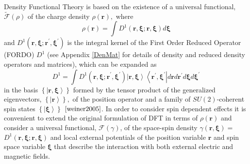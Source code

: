 \documentclass[aps,preprint]{revtex4}%
\begin{document}
\bigskip Density Functional Theory is based on the existence of a universal
functional, $\mathcal{\tilde{F}}\left(  \rho\right)  $ \cite{HK} of the charge
density $\rho\left(  \mathbf{r}\right)  ,$ where
\begin{equation}
\rho\left(  \mathbf{r}\right)  =\int D^{1}\left(  \mathbf{r,\xi;r,\xi}\right)
d\mathbf{\xi}%
\end{equation}
and $D^{1}\left(  \mathbf{r,\xi;r}^{\prime}\mathbf{,\xi}^{\prime}\right)  $ is
the integral kernel of the First Order Reduced Operator (FORDO) $D^{1}$
\cite{Coleman} (see Appendix \ref{DenMat} for details of density and reduced
density operators and matrices), which can be expanded as
\begin{equation}
D^{1}=\int D^{1}\left(  \mathbf{r,\xi;r}^{\prime}\mathbf{,\xi}^{\prime
}\right)  \left\vert \mathbf{r,\xi}\right\rangle \left\langle \mathbf{r}%
^{\prime}\mathbf{,\xi}^{\prime}\right\vert d\mathbf{r}d\mathbf{r}^{\prime
}d\mathbf{\xi}d\mathbf{\xi}^{\prime}%
\end{equation}
in the basis $\left\{  \left\vert \mathbf{r,\xi}\right\rangle \right\}  $
formed by the tensor product of the generalized eigenvectors, $\left\{
\left\vert \mathbf{r}\right\rangle \right\}  ,$ of the position operator and a
family of $SU(2)$-coherent spin states $\left\{  \left\vert \mathbf{\xi
}\right\rangle \right\}  $ $\cite{weiner2005}$. In order to consider spin
dependent effects it is convenient to extend the original formulation of DFT
in terms of $\rho\left(  \mathbf{r}\right)  $ and consider a universal
functional, $\mathcal{F}\left(  \gamma\right)  $, of the space-spin density
$\gamma\left(  \mathbf{r,\xi}\right)  =$ $D^{1}\left(  \mathbf{r,\xi;r,\xi
}\right)  $ \cite{weiner-trickey} and local external potentials of the
position variable $\mathbf{r}$ and spin space variable $\mathbf{\xi}$ that
describe the interaction with both external electric and magnetic fields.
\end{document}
